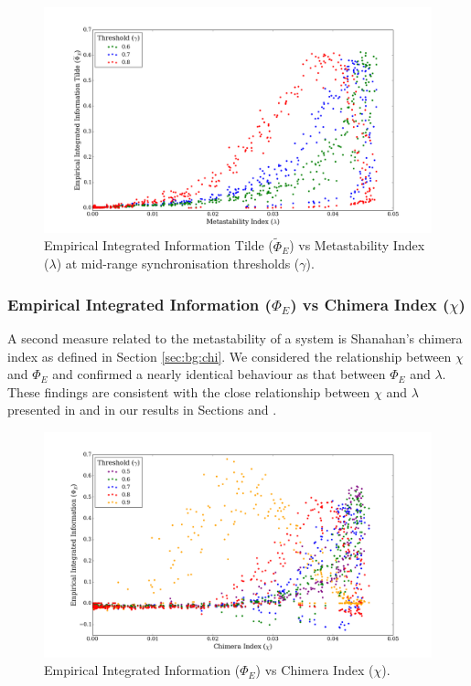 \documentclass[a4paper,11pt]{article}
\begin{document}
\begin{figure}[H]
\begin{center}
\includegraphics[scale = 0.35]{figures/phi_tilde_vs_lambda_mid}
\caption{
	Empirical Integrated Information Tilde ($\widetilde{\Phi}_E$) vs Metastability Index ($\lambda$) at mid-range synchronisation thresholds ($\gamma$).
	\label{fig:phi-tilde-vs-lambda-mid}
}
\end{center}
\end{figure}

\subsubsection{Empirical Integrated Information ($\Phi_{E}$) vs Chimera Index ($\chi$)}
\label{sec:app:osc:res:phi-v-chi}

A second measure related to the metastability of a system is Shanahan's chimera index as defined in Section \ref{sec:bg:chi}. We considered the relationship between $\chi$ and $\Phi_{E}$ and confirmed a nearly identical behaviour as that between $\Phi_E$ and $\lambda$. These findings are consistent with the close relationship between $\chi$ and $\lambda$ presented in \cite{Shanahan2010} and in our results in Sections \label{sec:app:osc:res:meta-v-beta} and \label{sec:app:osc:res:chi-v-beta}.

\begin{figure}[H]
\begin{center}
\includegraphics[scale = 0.35]{figures/phi_vs_chi_multi}
\caption{
	Empirical Integrated Information ($\Phi_E$) vs Chimera Index ($\chi$).
	\label{fig:phi-vs-chi-multi}
}
\end{center}
\end{figure}
\end{document}
